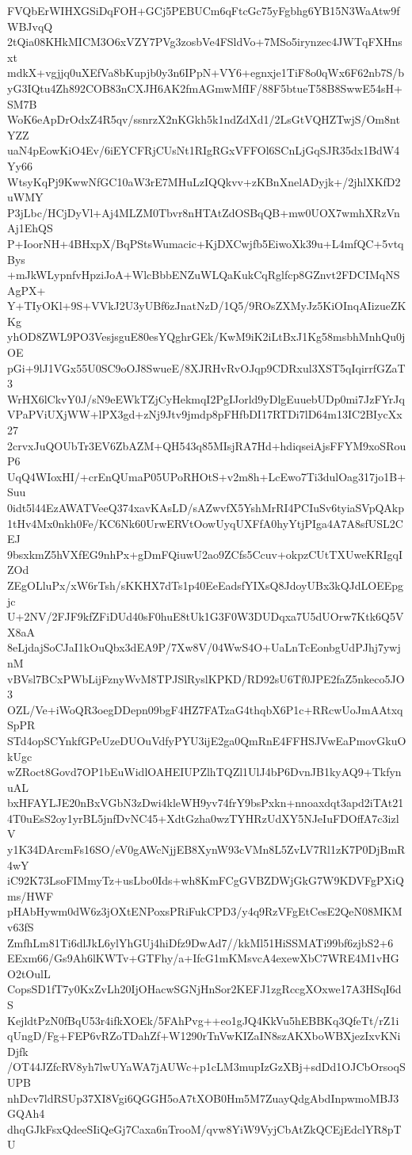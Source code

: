 FVQbErWIHXGSiDqFOH+GCj5PEBUCm6qFtcGc75yFgbhg6YB15N3WaAtw9fWBJvqQ
2tQia08KHkMICM3O6xVZY7PVg3zosbVe4FSldVo+7MSo5irynzec4JWTqFXHnsxt
mdkX+vgjjq0uXEfVa8bKupjb0y3n6IPpN+VY6+egnxje1TiF8o0qWx6F62nb7S/b
yG3IQtu4Zh892COB83nCXJH6AK2fmAGmwMfIF/88F5btueT58B8SwwE54sH+SM7B
WoK6eApDrOdxZ4R5qv/ssnrzX2nKGkh5k1ndZdXd1/2LsGtVQHZTwjS/Om8ntYZZ
uaN4pEowKiO4Ev/6iEYCFRjCUsNt1RIgRGxVFFOl6SCnLjGqSJR35dx1BdW4Yy66
WtsyKqPj9KwwNfGC10aW3rE7MHuLzIQQkvv+zKBnXnelADyjk+/2jhlXKfD2uWMY
P3jLbc/HCjDyVl+Aj4MLZM0Tbvr8nHTAtZdOSBqQB+mw0UOX7wmhXRzVnAj1EhQS
P+IoorNH+4BHxpX/BqPStsWumacic+KjDXCwjfb5EiwoXk39u+L4mfQC+5vtqBys
+mJkWLypnfvHpziJoA+WlcBbbENZuWLQaKukCqRglfcp8GZnvt2FDCIMqNSAgPX+
Y+TIyOKl+9S+VVkJ2U3yUBf6zJnatNzD/1Q5/9ROsZXMyJz5KiOInqAIizueZKKg
yhOD8ZWL9PO3VesjsguE80esYQghrGEk/KwM9iK2iLtBxJ1Kg58msbhMnhQu0jOE
pGi+9lJ1VGx55U0SC9oOJ8SwueE/8XJRHvRvOJqp9CDRxul3XST5qIqirrfGZaT3
WrHX6lCkvY0J/sN9eEWkTZjCyHekmqI2PgIJorld9yDlgEuuebUDp0mi7JzFYrJq
VPaPViUXjWW+lPX3gd+zNj9Jtv9jmdp8pFHfbDI17RTDi7lD64m13IC2BIycXx27
2crvxJuQOUbTr3EV6ZbAZM+QH543q85MIsjRA7Hd+hdiqseiAjsFFYM9xoSRouP6
UqQ4WIoxHI/+crEnQUmaP05UPoRHOtS+v2m8h+LcEwo7Ti3dulOag317jo1B+Suu
0idt5l44EzAWATVeeQ374xavKAsLD/sAZwvfX5YshMrRI4PCIuSv6tyiaSVpQAkp
1tHv4Mx0nkh0Fe/KC6Nk60UrwERVtOowUyqUXFfA0hyYtjPIga4A7A8sfUSL2CEJ
9bsxkmZ5hVXfEG9nhPx+gDmFQiuwU2ao9ZCfs5Ccuv+okpzCUtTXUweKRIgqIZOd
ZEgOLluPx/xW6rTsh/sKKHX7dTs1p40EeEadsfYIXsQ8JdoyUBx3kQJdLOEEpgjc
U+2NV/2FJF9kfZFiDUd40sF0huE8tUk1G3F0W3DUDqxa7U5dUOrw7Ktk6Q5VX8aA
8eLjdajSoCJaI1kOuQbx3dEA9P/7Xw8V/04WwS4O+UaLnTcEonbgUdPJhj7ywjnM
vBVsl7BCxPWbLijFznyWvM8TPJSlRyslKPKD/RD92sU6Tf0JPE2faZ5nkeco5JO3
OZL/Ve+iWoQR3oegDDepn09bgF4HZ7FATzaG4thqbX6P1c+RRcwUoJmAAtxqSpPR
STd4opSCYnkfGPeUzeDUOuVdfyPYU3ijE2ga0QmRnE4FFHSJVwEaPmovGkuOkUgc
wZRoct8Govd7OP1bEuWidlOAHEIUPZlhTQZl1UlJ4bP6DvnJB1kyAQ9+TkfynuAL
bxHFAYLJE20nBxVGbN3zDwi4kleWH9yv74frY9bsPxkn+nnoaxdqt3apd2iTAt21
4T0uEsS2oy1yrBL5jnfDvNC45+XdtGzha0wzTYHRzUdXY5NJeIuFDOffA7c3izlV
y1K34DArcmFs16SO/eV0gAWcNjjEB8XynW93cVMn8L5ZvLV7Rl1zK7P0DjBmR4wY
iC92K73LsoFIMmyTz+usLbo0Ids+wh8KmFCgGVBZDWjGkG7W9KDVFgPXiQms/HWF
pHAbHywm0dW6z3jOXtENPoxsPRiFukCPD3/y4q9RzVFgEtCesE2QeN08MKMv63fS
ZmfhLm81Ti6dlJkL6ylYhGUj4hiDfz9DwAd7//kkMl51HiSSMATi99bf6zjbS2+6
EExm66/Gs9Ah6lKWTv+GTFhy/a+IfcG1mKMsvcA4exewXbC7WRE4M1vHGO2tOulL
CopsSD1fT7y0KxZvLh20IjOHacwSGNjHnSor2KEFJ1zgRccgXOxwe17A3HSqI6dS
KejldtPzN0fBqU53r4ifkXOEk/5FAhPvg++eo1gJQ4KkVu5hEBBKq3QfeTt/rZ1i
qUngD/Fg+FEP6vRZoTDahZf+W1290rTnVwKIZaIN8szAKXboWBXjezIxvKNiDjfk
/OT44JZfcRV8yh7lwUYaWA7jAUWc+p1cLM3mupIzGzXBj+sdDd1OJCbOrsoqSUPB
nhDcv7ldRSUp37XI8Vgi6QGGH5oA7tXOB0Hm5M7ZuayQdgAbdInpwmoMBJ3GQAh4
dhqGJkFsxQdeeSIiQeGj7Caxa6nTrooM/qvw8YiW9VyjCbAtZkQCEjEdclYR8pTU
